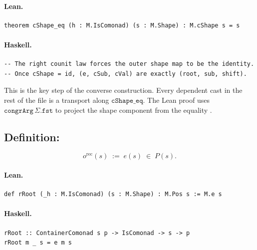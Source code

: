 \documentclass[11pt,a4paper]{article}
\begin{document}
\paragraph{Lean.}
\begin{lstlisting}[style=lean]
theorem cShape_eq (h : M.IsComonad) (s : M.Shape) : M.cShape s = s
\end{lstlisting}

\paragraph{Haskell.}
\begin{lstlisting}[style=haskell]
-- The right counit law forces the outer shape map to be the identity.
-- Once cShape = id, (e, cSub, cVal) are exactly (root, sub, shift).
\end{lstlisting}

\begin{fidelitynote}
This is the key step of the converse construction.  Every dependent cast in the
rest of the file is a transport along $\mathtt{cShape\_eq}$.  The Lean proof
uses $\mathtt{congrArg}\,\Sigma.\mathtt{fst}$ to project the shape component
from the equality .
\end{fidelitynote}


\subsection{Definition: }

\begin{defn}
\[
  o^\mathrm{rec}(s) \;:=\; e(s) \;\in\; P(s).
\]
\end{defn}

\paragraph{Lean.}
\begin{lstlisting}[style=lean]
def rRoot (_h : M.IsComonad) (s : M.Shape) : M.Pos s := M.e s
\end{lstlisting}

\paragraph{Haskell.}
\begin{lstlisting}[style=haskell]
rRoot :: ContainerComonad s p -> IsComonad -> s -> p
rRoot m _ s = e m s
\end{lstlisting}
\end{document}
